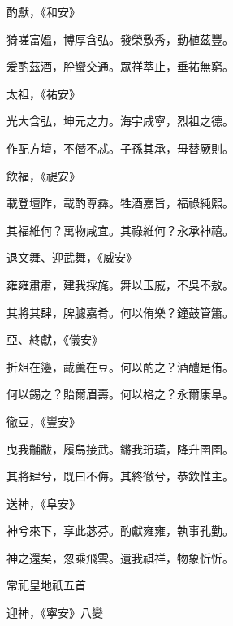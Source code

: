 \begin{pinyinscope}
 酌獻，《和安》



 猗嗟富媼，博厚含弘。發榮敷秀，動植茲豐。



 爰酌茲酒，肸蠁交通。眾祥萃止，垂祐無窮。



 太祖，《祐安》



 光大含弘，坤元之力。海宇咸寧，烈祖之德。



 作配方壇，不僭不忒。子孫其承，毋替厥則。



 飲福，《禔安》



 載登壇阼，載酌尊彞。牲酒嘉旨，福祿純熙。



 其福維何？萬物咸宜。其祿維何？永承神禧。



 退文舞、迎武舞，《威安》



 雍雍肅肅，建我採旄。舞以玉戚，不吳不敖。



 其將其肆，脾臄嘉肴。何以侑樂？鐘鼓管簫。



 亞、終獻，《儀安》



 折俎在籩，胾羹在豆。何以酌之？酒醴是侑。



 何以錫之？貽爾眉壽。何以格之？永爾康阜。



 徹豆，《豐安》



 曳我黼黻，履舄接武。鏘我珩璜，降升圉圉。



 其將肆兮，既曰不侮。其終徹兮，恭欽惟主。



 送神，《阜安》



 神兮來下，享此苾芬。酌獻雍雍，執事孔勤。



 神之還矣，忽乘飛雲。遺我祺祥，物象忻忻。



 常祀皇地祇五首



 迎神，《寧安》八變




\end{pinyinscope}
